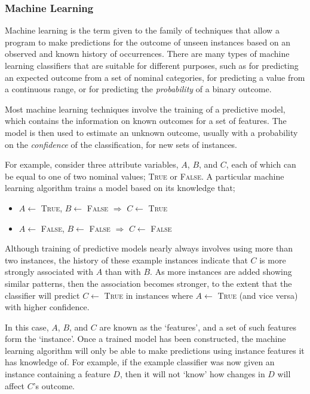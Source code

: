 \subsubsection{Machine Learning}
Machine learning is the term given to the family of techniques that allow a program to make predictions for the outcome of unseen instances based on an observed and known history of occurrences. There are many types of machine learning classifiers that are suitable for different purposes, such as for predicting an expected outcome from a set of nominal categories, for predicting a value from a continuous range, or for predicting the \textit{probability} of a binary outcome.

Most machine learning techniques involve the training of a predictive model, which contains the information on known outcomes for a set of features. The model is then used to estimate an unknown outcome, usually with a probability on the \textit{confidence} of the classification, for new sets of instances.

For example, consider three attribute variables, $A$, $B$, and $C$, each of which can be equal to one of two nominal values; \textsc{True} or \textsc{False}. A particular machine learning algorithm trains a model based on its knowledge that;
\begin{itemize}
    \item $A\gets$ \textsc{True}, $B\gets$ \textsc{False} $\Longrightarrow$ $C\gets$ \textsc{True}
    \item $A\gets$ \textsc{False}, $B\gets$ \textsc{False} $\Longrightarrow$ $C\gets$ \textsc{False}
\end{itemize}
Although training of predictive models nearly always involves using more than two instances, the history of these example instances indicate that $C$ is more strongly associated with $A$ than with $B$. As more instances are added showing similar patterns, then the association becomes stronger, to the extent that the classifier will predict $C\gets$ \textsc{True} in instances where $A\gets$ \textsc{True} (and vice versa) with higher confidence.

In this case, $A$, $B$, and $C$ are known as the `features', and a set of such features form the `instance'. Once a trained model has been constructed, the machine learning algorithm will only be able to make predictions using instance features it has knowledge of. For example, if the example classifier was now given an instance containing a feature $D$, then it will not `know' how changes in $D$ will affect $C$'s outcome.

